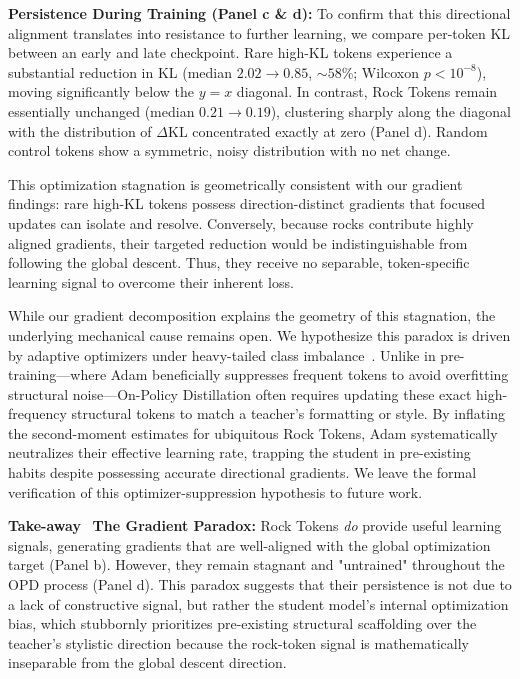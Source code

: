 \textbf{Persistence During Training (Panel c \& d):} 
To confirm that this directional alignment translates into resistance to further learning, we compare per-token KL between an early and late checkpoint. Rare high-KL tokens experience a substantial reduction in KL (median $2.02 \to 0.85$, $\sim 58\%$; Wilcoxon $p < 10^{-8}$), moving significantly below the $y=x$ diagonal. In contrast, Rock Tokens remain essentially unchanged (median $0.21 \to 0.19$), clustering sharply along the diagonal with the distribution of $\Delta \text{KL}$ concentrated exactly at zero (Panel d). Random control tokens show a symmetric, noisy distribution with no net change.

This optimization stagnation is geometrically consistent with our gradient findings: rare high-KL tokens possess direction-distinct gradients that focused updates can isolate and resolve. Conversely, because rocks contribute highly aligned gradients, their targeted reduction would be indistinguishable from following the global descent. Thus, they receive no separable, token-specific learning signal to overcome their inherent loss.


While our gradient decomposition explains the geometry of this stagnation, the underlying mechanical cause remains open. We hypothesize this paradox is driven by adaptive optimizers under heavy-tailed class imbalance~\cite{kunstner2024heavytailedclassimbalanceadam}. Unlike in pre-training—where Adam beneficially suppresses frequent tokens to avoid overfitting structural noise—On-Policy Distillation often requires updating these exact high-frequency structural tokens to match a teacher's formatting or style. By inflating the second-moment estimates for ubiquitous Rock Tokens, Adam systematically neutralizes their effective learning rate, trapping the student in pre-existing habits despite possessing accurate directional gradients. We leave the formal verification of this optimizer-suppression hypothesis to future work.

\begin{takeaway}
\textcolor{tabblue}{\textbf{Take-away}}~ \textbf{The Gradient Paradox:} Rock Tokens \textit{do} provide useful learning signals, generating gradients that are well-aligned with the global optimization target (Panel b). However, they remain stagnant and "untrained" throughout the OPD process (Panel d). This paradox suggests that their persistence is not due to a lack of constructive signal, but rather the student model's internal optimization bias, which stubbornly prioritizes pre-existing structural scaffolding over the teacher's stylistic direction because the rock-token signal is mathematically inseparable from the global descent direction.
\end{takeaway}